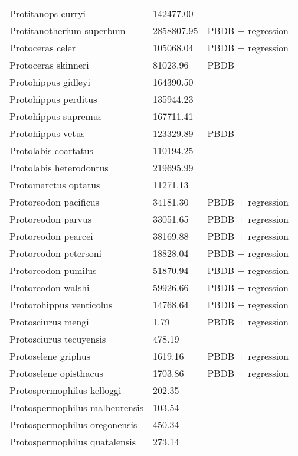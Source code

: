 \documentclass{article}
\begin{document}
\begin{center}
\begin{longtable}{p{} p{} p{}}
    Protitanops curryi & 142477.00 & \cite{McKenna2011} \\ 
    Protitanotherium superbum & 2858807.95 & PBDB + regression \\ 
    Protoceras celer & 105068.04 & PBDB + regression \\ 
    Protoceras skinneri & 81023.96 & PBDB \\ 
    Protohippus gidleyi & 164390.50 & \cite{Tomiya2013} \\ 
    Protohippus perditus & 135944.23 & \cite{Tomiya2013} \\ 
    Protohippus supremus & 167711.41 & \cite{Tomiya2013} \\ 
    Protohippus vetus & 123329.89 & PBDB \\ 
    Protolabis coartatus & 110194.25 & \cite{Tomiya2013} \\ 
    Protolabis heterodontus & 219695.99 & \cite{Tomiya2013} \\ 
    Protomarctus optatus & 11271.13 & \cite{Tomiya2013} \\ 
    Protoreodon pacificus & 34181.30 & PBDB + regression \\ 
    Protoreodon parvus & 33051.65 & PBDB + regression \\ 
    Protoreodon pearcei & 38169.88 & PBDB + regression \\ 
    Protoreodon petersoni & 18828.04 & PBDB + regression \\ 
    Protoreodon pumilus & 51870.94 & PBDB + regression \\ 
    Protoreodon walshi & 59926.66 & PBDB + regression \\ 
    Protorohippus venticolus & 14768.64 & PBDB + regression \\ 
    Protosciurus mengi & 1.79 & PBDB + regression \\ 
    Protosciurus tecuyensis & 478.19 & \cite{Tomiya2013} \\ 
    Protoselene griphus & 1619.16 & PBDB + regression \\ 
    Protoselene opisthacus & 1703.86 & PBDB + regression \\ 
    Protospermophilus kelloggi & 202.35 & \cite{Tomiya2013} \\ 
    Protospermophilus malheurensis & 103.54 & \cite{Tomiya2013} \\ 
    Protospermophilus oregonensis & 450.34 & \cite{Tomiya2013} \\ 
    Protospermophilus quatalensis & 273.14 & \cite{Tomiya2013} \\ 

\end{longtable}
\end{center}
\end{document}
